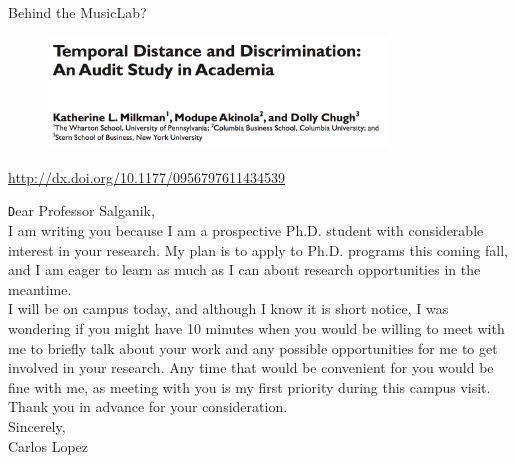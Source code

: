 \documentclass[aspectratio=169]{beamer}
\def\vf{\vfill}
\begin{document}
\begin{frame}

{\Large
\begin{center}
Behind the MusicLab?
\end{center}
}

\end{frame}
\begin{frame}

\begin{figure}
  \centering
  \includegraphics[width=0.8\textwidth]{figures/milkman_temporal_2012_title.png}
\end{figure}

\vf
\tiny{\url{http://dx.doi.org/10.1177/0956797611434539}}

\end{frame}
\begin{frame}

{\texttt
Dear Professor Salganik,\\ 

I am writing you because I am a prospective Ph.D. student with considerable interest in your research. My plan is to apply to Ph.D. programs this coming fall, and I am eager to learn as much as I can about research opportunities in the meantime.\\

I will be on campus today, and although I know it is short notice, I was wondering if you might have 10 minutes when you would be willing to meet with me to briefly talk about your work and any possible opportunities for me to get involved in your research. Any time that would be convenient for you would be fine with me, as meeting with you is my first priority during this campus visit.\\

Thank you in advance for your consideration.\\

Sincerely,\\
Carlos Lopez
}

\end{frame}
\end{document}
